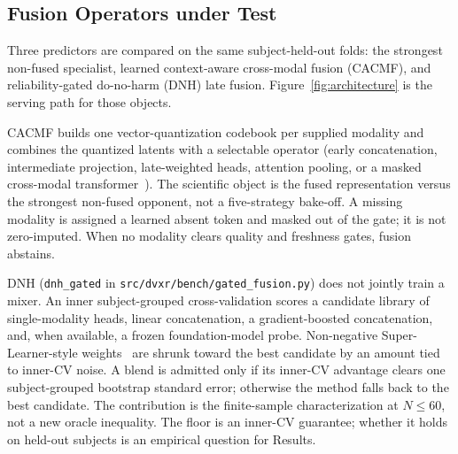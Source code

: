 \subsection{Fusion Operators under Test}
\label{subsec:fusion}

Three predictors are compared on the same subject-held-out folds: the strongest non-fused
specialist, learned context-aware cross-modal fusion (CACMF), and reliability-gated do-no-harm
(DNH) late fusion. Figure~\ref{fig:architecture} is the serving path for those objects.

CACMF builds one vector-quantization codebook per supplied modality and combines the quantized
latents with a selectable operator (early concatenation, intermediate projection, late-weighted
heads, attention pooling, or a masked cross-modal transformer~\cite{medfuse,medpatch}). The
scientific object is the fused representation versus the strongest non-fused opponent, not a
five-strategy bake-off. A missing modality is assigned a learned absent token and masked out of
the gate; it is not zero-imputed. When no modality clears quality and freshness gates, fusion
abstains.

DNH (\texttt{dnh\_gated} in \texttt{src/dvxr/bench/gated\_fusion.py}) does not jointly train a
mixer. An inner subject-grouped cross-validation scores a candidate library of single-modality
heads, linear concatenation, a gradient-boosted concatenation, and, when available, a frozen
foundation-model probe. Non-negative Super-Learner-style weights~\cite{vanderlaan2007superlearner}
are shrunk toward the best candidate by an amount tied to inner-CV noise. A blend is admitted
only if its inner-CV advantage clears one subject-grouped bootstrap standard error; otherwise
the method falls back to the best candidate. The contribution is the finite-sample
characterization at $N\le 60$, not a new oracle inequality. The floor is an inner-CV guarantee;
whether it holds on held-out subjects is an empirical question for Results.
